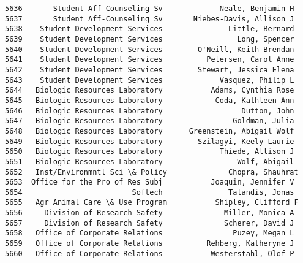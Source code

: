 \documentclass[11pt]{article}
\begin{document}
\begin{Verbatim}[commandchars=\\\{\}]
5636       Student Aff-Counseling Sv             Neale, Benjamin H   
5637       Student Aff-Counseling Sv       Niebes-Davis, Allison J   
5638    Student Development Services               Little, Bernard   
5639    Student Development Services                 Long, Spencer   
5640    Student Development Services        O'Neill, Keith Brendan   
5641    Student Development Services          Petersen, Carol Anne   
5642    Student Development Services        Stewart, Jessica Elena   
5643    Student Development Services             Vasquez, Philip L   
5644   Biologic Resources Laboratory           Adams, Cynthia Rose   
5645   Biologic Resources Laboratory            Coda, Kathleen Ann   
5646   Biologic Resources Laboratory                  Dutton, John   
5647   Biologic Resources Laboratory                Goldman, Julia   
5648   Biologic Resources Laboratory      Greenstein, Abigail Wolf   
5649   Biologic Resources Laboratory        Szilagyi, Keely Laurie   
5650   Biologic Resources Laboratory             Thiede, Allison J   
5651   Biologic Resources Laboratory                 Wolf, Abigail   
5652   Inst/Environmntl Sci \& Policy              Chopra, Shauhrat   
5653  Office for the Pro of Res Subj           Joaquin, Jennifer V   
5654                         Softech               Talandis, Jonas   
5655   Agr Animal Care \& Use Program           Shipley, Clifford F   
5656     Division of Research Safety              Miller, Monica A   
5657     Division of Research Safety              Scherer, David J   
5658   Office of Corporate Relations                Puzey, Megan L   
5659   Office of Corporate Relations          Rehberg, Katheryne J   
5660   Office of Corporate Relations           Westerstahl, Olof P   


\end{Verbatim}
\end{document}
